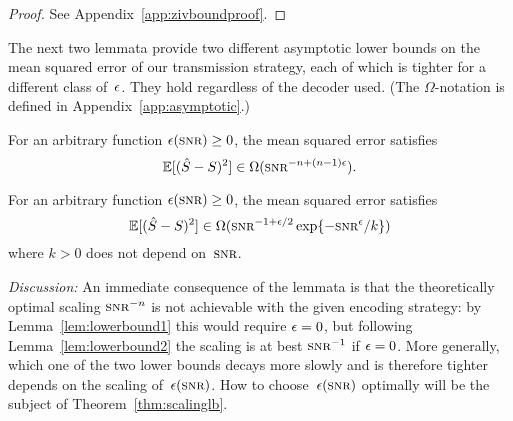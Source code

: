 \begin{proof}
  See Appendix~\ref{app:zivboundproof}.
\end{proof}

The next two lemmata provide two different asymptotic lower bounds on the
mean squared error of our transmission strategy, each of which is tighter for a
different class of~$\epsilon$. They hold regardless of the decoder used.  (The
$\Omega$-notation is defined in Appendix~\ref{app:asymptotic}.)

\begin{lemma}
  \label{lem:lowerbound1}
  For an arbitrary function $\e(\snr) \ge 0$, the mean squared error satisfies
  \begin{equation*}
    \mse \in \Omega(\snr^{-n + (n-1)\e}).
  \end{equation*}
\end{lemma}

\begin{lemma}
  \label{lem:lowerbound2}
  For an arbitrary function $\e(\snr) \ge 0$, the mean squared error satisfies
  \begin{equation*}
    \mse \in \Omega(\snr^{-1+\e/2} \exp\{-\snr^\e/k\})
  \end{equation*}
  where $k > 0$ does not depend on~$\snr$.
\end{lemma}

\emph{Discussion:} An immediate consequence of the lemmata is that the
theoretically optimal scaling $\snr^{-n}$ is not achievable with the given
encoding strategy: by Lemma~\ref{lem:lowerbound1} this would require $\epsilon = 0$,
but following Lemma~\ref{lem:lowerbound2} the scaling is at best $\snr^{-1}$ if
$\epsilon = 0 $.  More generally, which one of the two lower bounds decays more slowly
and is therefore tighter depends on the scaling of~$\e(\snr)$. How to
choose~$\e(\snr)$ optimally will be the subject of Theorem~\ref{thm:scalinglb}.

